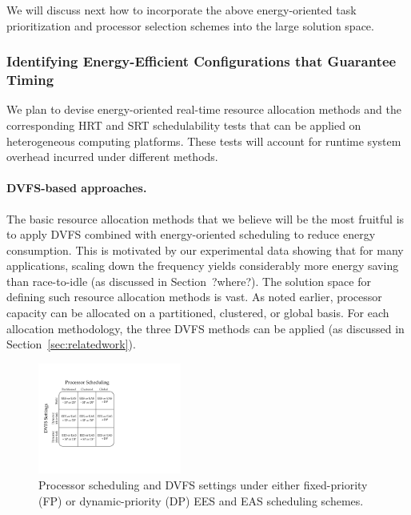 We will discuss next how to incorporate the above energy-oriented task prioritization and processor selection schemes into the large solution space.

\subsubsection{Identifying Energy-Efficient Configurations that Guarantee Timing}
\label{sec:step1Config}

We plan to devise energy-oriented real-time resource allocation methods and the corresponding HRT and SRT schedulability tests that can be applied on heterogeneous computing platforms. These tests will account for runtime system overhead incurred under different methods.

\paragraph{DVFS-based approaches.} The basic resource allocation methods that we believe will be the most fruitful is to apply DVFS combined with energy-oriented scheduling to reduce energy consumption. This is motivated by our experimental data showing that for many applications, scaling down the frequency yields considerably more energy saving than race-to-idle (as discussed in Section~?where?). The solution space for defining such resource allocation methods is vast. As noted earlier, processor capacity can be allocated on a partitioned, clustered, or global basis. For each allocation methodology, the three DVFS methods can be applied (as discussed in Section~\ref{sec:relatedwork}).

\begin{figure}
\vspace{-3mm}
\centerline{
\includegraphics[width=0.42\textwidth]{images/configurations.pdf}
} \caption{\small Processor scheduling and DVFS settings under either fixed-priority (FP) or dynamic-priority (DP) EES and EAS scheduling schemes.}\normalsize
\label{fig:configurations}
\end{figure}

